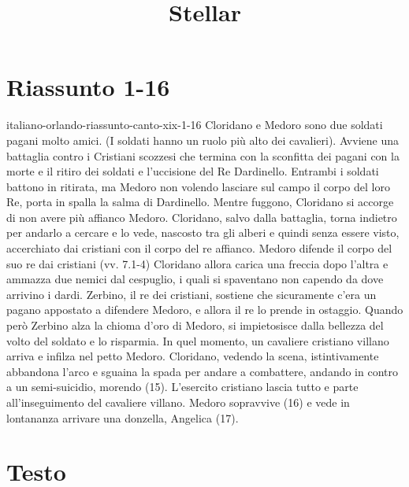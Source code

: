 \documentclass[preview]{standalone}
\begin{document}
\title{Stellar}
\genpage

\section{Riassunto 1-16}

\begin{snippet}{italiano-orlando-riassunto-canto-xix-1-16}
    Cloridano e Medoro sono due soldati pagani molto amici. (I soldati hanno un ruolo più alto dei cavalieri).
    Avviene una battaglia contro i Cristiani scozzesi che termina con la sconfitta dei pagani con la morte e il ritiro dei soldati e l'uccisione del Re Dardinello.
    Entrambi i soldati battono in ritirata, ma Medoro non volendo lasciare sul campo il corpo del loro Re, porta in spalla la salma di Dardinello.
    Mentre fuggono, Cloridano si accorge di non avere più affianco Medoro.
    Cloridano, salvo dalla battaglia, torna indietro per andarlo a cercare e lo vede, nascosto tra gli alberi e quindi senza essere visto, accerchiato dai cristiani con il corpo del re affianco.
    Medoro difende il corpo del suo re dai cristiani  (vv. 7.1-4)
    Cloridano allora carica una freccia dopo l'altra e ammazza due nemici dal cespuglio, i quali si spaventano non capendo da dove arrivino i dardi.
    Zerbino, il re dei cristiani, sostiene che sicuramente c'era un pagano appostato a difendere Medoro, e allora il re lo prende in ostaggio.
    Quando però Zerbino alza la chioma d'oro di Medoro, si impietosisce dalla bellezza del volto del soldato e lo risparmia.
    In quel momento, un cavaliere cristiano villano arriva e infilza nel petto Medoro.
    Cloridano, vedendo la scena, istintivamente abbandona l'arco e sguaina la spada per andare a combattere, andando in contro a un semi-suicidio, morendo (15).
    L'esercito cristiano lascia tutto e parte all'inseguimento del cavaliere villano.
    Medoro sopravvive (16) e vede in lontananza arrivare una donzella, Angelica (17).
\end{snippet}

\section{Testo}
\end{document}
